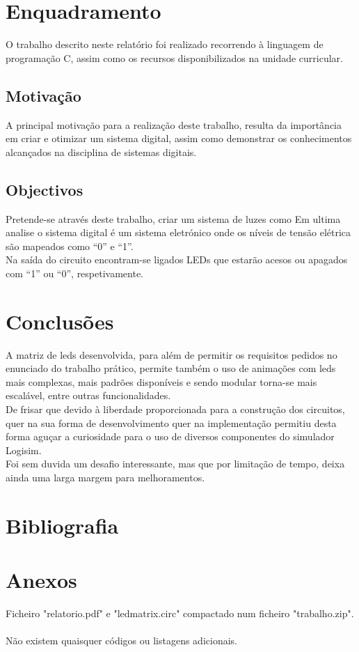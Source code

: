 \documentclass[12pt,a4paper,portrait]{article}
\begin{document}
	\section{Enquadramento}
	O trabalho descrito neste relatório foi realizado recorrendo à linguagem de programação C, assim como os recursos disponibilizados na unidade curricular.\\
		\subsection{Motivação}
			A principal motivação para a realização deste trabalho, resulta da importância em criar e otimizar um sistema digital, assim como demonstrar os conhecimentos alcançados na disciplina de sistemas digitais.\\
		\subsection{Objectivos}
			Pretende-se através deste trabalho, criar um sistema de luzes como 	
			Em ultima analise o sistema digital é um sistema eletrónico onde os níveis de tensão elétrica são  mapeados como “0” e “1”.\\
			Na saída do circuito encontram-se ligados LEDs que estarão acesos ou apagados com “1” ou “0”, respetivamente.\\
	\section{Conclusões}
		A matriz de leds desenvolvida, para além de permitir os requisitos pedidos no enunciado do trabalho prático, permite também o uso de animações com leds mais complexas, mais padrões disponíveis e sendo modular torna-se mais escalável, entre outras funcionalidades.\\
		De frisar que devido à liberdade proporcionada para a construção dos circuitos, quer na sua forma de desenvolvimento quer na implementação permitiu desta forma aguçar a curiosidade para o uso de diversos componentes do simulador Logisim.\\
		Foi sem duvida um desafio interessante, mas que por limitação de tempo, deixa ainda uma larga margem para melhoramentos.\\
	\newpage
	\section{Bibliografia}
	
	

	\newpage
	\section{Anexos}
		Ficheiro "relatorio.pdf" e "ledmatrix.circ" compactado num ficheiro "trabalho.zip".\\\\
		Não existem quaisquer códigos ou listagens adicionais.\\					
\end{document}
